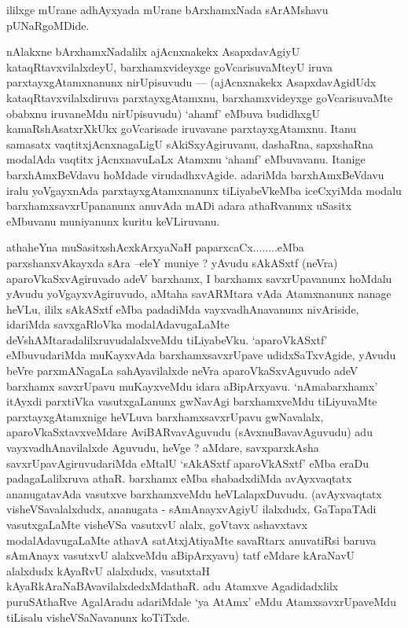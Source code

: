 \centerline{ililxge mUrane adhAyxyada mUrane bArxhamxNada sArAMshavu pUNaRgoMDide.}


\begin{artha}
nAlakxne bArxhamxNadalilx ajAcnxnakekx AsapxdavAgiyU kataqRtavxvilalxdeyU, barxhamx\-videyxge goVcarisuvaMteyU iruva parxtayxgAtamxnanunx nirUpisuvudu --- (ajAcnxnakekx \-AsapxdavAgidUdx kataqRtavxvilalxdiruva parxtayxgAtamxnu, barxhamxvideyxge goVcarisuvaMte \-obabxnu iruvaneMdu nirUpisuvudu) `ahamf' eMbuva budidhxgU kamaRshAsatxrXkUkx \break goVcarisade iruvavane parxtayxgAtamxnu. Itanu samasatx vaqtitxjAcnxnagaLigU sAkiSxyAgi\-ruvanu, dashaRna, sapxshaRna modalAda vaqtitx jAcnxnavuLaLx Atamxnu `ahamf' eMbu\-vavanu. Itanige barxhAmxBeVdavu hoMdade virudadhxvAgide. adariMda barxhAmx\-BeVdavu iralu yoVgayxnAda parxtayxgAtamxnanunx tiLiyabeVkeMba iceCxyiMda modalu barxhamx\-savxrUpananunx anuvAda mADi adara athaRvanunx uSasitx eMbuvanu muniyanunx kuritu keVLiruvanu.
\end{artha}


\begin{artha}
athaheYna muSasitxshAcxkArxyaNaH paparxcaCx........eMba parxshanxvAkayxda sAra --eleY muniye ? yAvudu sAkASxtf (neVra) aparoVkaSxvAgiruvado adeV barxhamx, \-I barxhamx savxrUpavanunx hoMdalu yAvudu yoVgayxvAgiruvudo, aMtaha savARM\-tara vAda Atamxnanunx nanage heVLu, ililx sAkASxtf eMba padadiMda vayxvadhAnavanunx nivAri\-side, idariMda savxgaRloVka modalAdavugaLaMte deVshAMtaradalilxruvudalalx\-veMdu tiLiyabeVku. `aparoVkASxtf' eMbuvudariMda muKayxvAda barxhamx\-savxrUpave udidxSaTxvAgide, yAvudu beVre parxmANagaLa sahAyavilalxde neVra aparoVkaSxvAgu\-vudo adeV barxhamx savxrUpavu muKayxveMdu idara aBipArxyavu. `nAmabarxhamx' itAyxdi parxtiVka vasutxgaLanunx gwNavAgi barxhamxveMdu tiLiyuvaMte parxtayxgAtamxnige heVLuva barxhamxsavxrUpavu gwNavalalx, aparoVkaSxtavxveMdare AviBARvavAguvudu (sAvxnuBavavAguvudu) adu vayxvadhAnavilalxde Aguvudu, heVge ? aMdare, savxparxkAsha savxrUpavAgiruvudariMda eMtalU `sAkASxtf aparoVkASxtf' eMba eraDu padagaLalilxruva athaR. barxhamx eMba shabadxdiMda avAyxvaqtatx ananugatavAda vasutxve barxhamxveMdu heVLalapxDuvudu. (avAyxvaqtatx visheVSavalalxdudx, ananugata - sAmAnayxvAgiyU ilalxdudx, GaTapaTAdi vasutxgaLaMte visheVSa vasutxvU alalx, goVtavx ashavxtavx modalAdavugaLaMte athavA satAtxjAtiyaMte savaRtarx anuvatiRsi baruva sAmAnayx vasutxvU alalxveMdu aBipArxyavu) tatf eMdare kAraNavU alalxdudx kAyaRvU alalxdudx, vasutxtaH kAyaRkAraNaBAvavilalxdedxMdathaR. adu Atamxve Agadidadxlilx puruSAthaRve AgalAradu adariMdale `ya AtAmx' eMdu AtamxsavxrUpaveMdu tiLisalu visheVSaNavanunx koTiTxde.
\end{artha}

